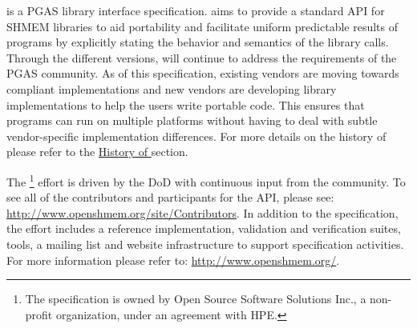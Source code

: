 \openshmem is a \ac{PGAS} library interface specification. \openshmem aims to
provide a standard \ac{API} for SHMEM libraries to aid portability and
facilitate uniform predictable results of \openshmem programs by explicitly
stating the behavior and semantics of the \openshmem library calls. Through the
different versions, \openshmem will continue to address the requirements of the
\ac{PGAS} community.  As of this specification, existing vendors are moving
towards \openshmem compliant implementations and new vendors are developing
\openshmem library implementations to help the users write portable \openshmem
code. This ensures that programs can run on multiple platforms without having to
deal with subtle vendor-specific implementation differences. For more details on
the history of \openshmem please refer to the
\hyperref[sec:openshmem_history]{History of \openshmem} section.  

The \openshmem\footnote{The \openshmem specification is owned by Open Source
Software Solutions Inc., a non-profit organization, under an agreement with
\ac{HPE}.} effort is driven by the \ac{DoD} with continuous input from the \openshmem community.
To see all of the contributors and participants for the \openshmem API,
please see: \url{http://www.openshmem.org/site/Contributors}. In addition to the
specification, the effort includes a reference \openshmem
implementation, validation and verification suites, tools, a mailing list and
website infrastructure to support specification activities. For more information
please refer to: \url{http://www.openshmem.org/}.
